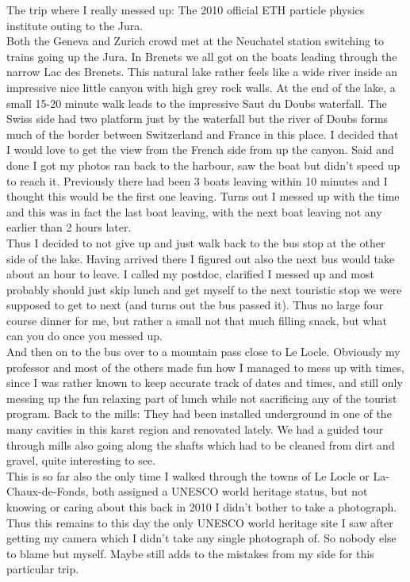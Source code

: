 The trip where I really messed up: The 2010 official ETH particle physics institute outing to the Jura.\\
Both the Geneva and Zurich crowd met at the Neuchatel station switching to trains going up the Jura. In Brenets we all got on the boats leading through the narrow Lac des Brenets. This natural lake rather feels like a wide river inside an impressive nice little canyon with high grey rock walls. At the end of the lake, a small 15-20 minute walk leads to the impressive Saut du Doubs waterfall. The Swiss side had two platform just by the waterfall but the river of Doubs forms much of the border between Switzerland and France in this place. I decided that I would love to get the view from the French side from up the canyon. Said and done I got my photos ran back to the harbour, saw the boat but didn't speed up to reach it. Previously there had been 3 boats leaving within 10 minutes and I thought this would be the first one leaving. Turns out I messed up with the time and this was in fact the last boat leaving, with the next boat leaving not any earlier than 2 hours later.\\
Thus I decided to not give up and just walk back to the bus stop at the other side of the lake. Having arrived there I figured out also the next bus would take about an hour to leave. I called my postdoc, clarified I messed up and most probably should just skip lunch and get myself to the next touristic stop we were supposed to get to next (and turns out the bus passed it). Thus no large four course dinner for me, but rather a small not that much filling snack, but what can you do once you messed up.\\
And then on to the bus over to a mountain pass close to Le Locle. Obviously my professor and most of the others made fun how I managed to mess up with times, since I was rather known to keep accurate track of dates and times, and still only messing up the fun relaxing part of lunch while not sacrificing any of the tourist program. Back to the mills: They had been installed underground in one of the many cavities in this karst region and renovated lately. We had a guided tour through mills also going along the shafts which had to be cleaned from dirt and gravel, quite interesting to see.\\
This is so far also the only time I walked through the towns of Le Locle or La-Chaux-de-Fonds, both assigned a UNESCO world heritage status, but not knowing or caring about this back in 2010 I didn't bother to take a photograph. Thus this remains to this day the only UNESCO world heritage site I saw after getting my camera which I didn't take any single photograph of. So nobody else to blame but myself. Maybe still adds to the mistakes from my side for this particular trip.

